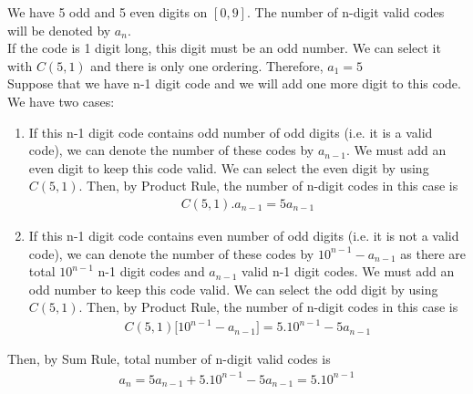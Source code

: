 \documentclass[11pt]{article}
\begin{document}
    We have 5 odd and 5 even digits on $[0,9]$. The number of n-digit valid codes will be denoted by $a_n$. \\
    If the code is 1 digit long, this digit must be an odd number. We can select it with $C(5,1)$ and there is only one ordering. Therefore, $a_1 = 5$\\
    Suppose that we have n-1 digit code and we will add one more digit to this code. We have two cases:
    \begin{enumerate}
        \item If this n-1 digit code contains odd number of odd digits (i.e. it is a valid code), we can denote the number of these codes by $a_{n-1}$. We must add an even digit to keep this code valid. We can select the even digit by using $C(5,1)$. Then, by Product Rule, the number of n-digit codes in this case is
        \begin{gather*}
            C(5,1).a_{n-1} = 5a_{n-1}
        \end{gather*}
        \item If this n-1 digit code contains even number of odd digits (i.e. it is not a valid code), we can denote the number of these codes by $10^{n-1}-a_{n-1}$ as there are total $10^{n-1}$ n-1 digit codes and $a_{n-1}$ valid n-1 digit codes. We must add an odd number to keep this code valid. We can select the odd digit by using $C(5,1)$. Then, by Product Rule, the number of n-digit codes in this case is 
        \begin{gather*}
            C(5,1) \big[ 10^{n-1}-a_{n-1} \big] = 5.10^{n-1}-5a_{n-1}
        \end{gather*} 
    \end{enumerate}
    
    Then, by Sum Rule, total number of n-digit valid codes is 
    \begin{gather*}
        a_n = 5a_{n-1} + 5.10^{n-1}-5a_{n-1}  = 5.10^{n-1}
    \end{gather*}
    
    
\end{document}
